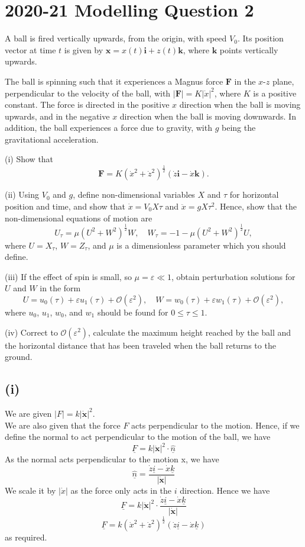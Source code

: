 \documentclass[1pt]{article}
\begin{document}
\section{2020-21 Modelling Question 2}
A ball is fired vertically upwards, from the origin, with speed $V_0$. Its position vector at time $t$ is given by $\mathbf{x} = x(t)\mathbf{i} + z(t)\mathbf{k}$, where $\mathbf{k}$ points vertically upwards.

The ball is spinning such that it experiences a Magnus force $\mathbf{F}$ in the $x$-$z$ plane, perpendicular to the velocity of the ball, with $|\mathbf{F}| = K|\dot{x}|^2$, where $K$ is a positive constant. The force is directed in the positive $x$ direction when the ball is moving upwards, and in the negative $x$ direction when the ball is moving downwards. In addition, the ball experiences a force due to gravity, with $g$ being the gravitational acceleration.

(i) Show that
\[
\mathbf{F} = K\left(\dot{x}^2 + \dot{z}^2\right)^{\frac{1}{2}}\left(\dot{z}\mathbf{i} - \dot{x}\mathbf{k}\right).
\]

(ii) Using $V_0$ and $g$, define non-dimensional variables $X$ and $\tau$ for horizontal position and time, and show that $\dot{x} = V_0X\tau$ and $\ddot{x} = gX\tau^2$.
Hence, show that the non-dimensional equations of motion are
\[
U_{\tau} = \mu\left(U^2 + W^2\right)^{\frac{1}{2}}W, \quad W_{\tau} = -1 - \mu\left(U^2 + W^2\right)^{\frac{1}{2}}U,
\]
where $U = X_{\tau}$, $W = Z_{\tau}$, and $\mu$ is a dimensionless parameter which you should define.

(iii) If the effect of spin is small, so $\mu = \varepsilon \ll 1$, obtain perturbation solutions for $U$ and $W$ in the form
\[
U = u_0(\tau) + \varepsilon u_1(\tau) + \mathcal{O}(\varepsilon^2), \quad W = w_0(\tau) + \varepsilon w_1(\tau) + \mathcal{O}(\varepsilon^2),
\]
where $u_0$, $u_1$, $w_0$, and $w_1$ should be found for $0 \leq \tau \leq 1$.

(iv) Correct to $\mathcal{O}(\varepsilon^2)$, calculate the maximum height reached by the ball and the horizontal distance that has been traveled when the ball returns to the ground.


\subsection*{(i)}
We are given $|F|=k|\dot{\mathbf{x}}|^2$.
\\ We are also given that the force $F$ acts perpendicular to the motion. Hence, if we define the normal to act perpendicular to the motion of the ball, we have $$\underline{F}=k|\dot{\mathbf{x}}|^2 \cdot \underline{\hat{n}}$$ As the normal acts perpendicular to the motion x, we have $$\underline{\hat{n}}=\frac{\dot{z}\underline{i}-\dot{x}\underline{k}}{|\dot{\mathbf{x}}|}$$ We scale it by $|\dot{x}|$ as the force only acts in the $i$ direction. Hence we have 
$$\underline{F}=k|\dot{\mathbf{x}}|^2 \cdot \frac{\dot{z}\underline{i}-\dot{x}\underline{k}}{|\dot{\mathbf{x}}|}$$
$$\underline{F}=k(\dot{x}^2+\dot{z}^2)^{\frac{1}{2}}(\dot{z}\underline{i}-\dot{x}\underline{k})$$ as required.
\end{document}
